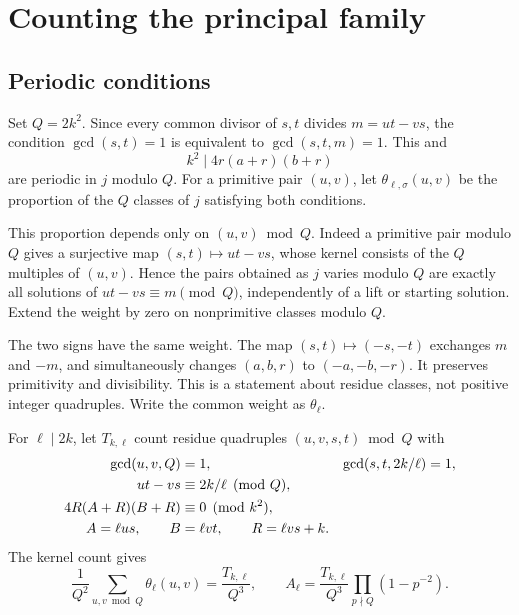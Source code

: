 \documentclass[11pt,a4paper]{article}
\numberwithin{equation}{section}
\theoremstyle{remark}
\begin{document}
\section{Counting the principal family}\label{sec:count}
\subsection{Periodic conditions}
Set $Q=2k^2$. Since every common divisor of $s,t$ divides $m=ut-vs$, the condition $\gcd(s,t)=1$ is equivalent to $\gcd(s,t,m)=1$. This and
\[
k^2\mid4r(a+r)(b+r)
\]
are periodic in $j$ modulo $Q$. For a primitive pair $(u,v)$, let $\theta_{\ell,\sigma}(u,v)$ be the proportion of the $Q$ classes of $j$ satisfying both conditions.

This proportion depends only on $(u,v)\bmod Q$. Indeed a primitive pair modulo $Q$ gives a surjective map $(s,t)\mapsto ut-vs$, whose kernel consists of the $Q$ multiples of $(u,v)$. Hence the pairs obtained as $j$ varies modulo $Q$ are exactly all solutions of $ut-vs\equiv m\pmod Q$, independently of a lift or starting solution. Extend the weight by zero on nonprimitive classes modulo $Q$.

The two signs have the same weight. The map $(s,t)\mapsto(-s,-t)$ exchanges $m$ and $-m$, and simultaneously changes $(a,b,r)$ to $(-a,-b,-r)$. It preserves primitivity and divisibility. This is a statement about residue classes, not positive integer quadruples. Write the common weight as $\theta_\ell$.

For $\ell\mid2k$, let $T_{k,\ell}$ count residue quadruples $(u,v,s,t)\bmod Q$ with
\begin{align}
\gcd(u,v,Q)&=1,&\gcd(s,t,2k/\ell)&=1,\notag\\
ut-vs&\equiv2k/\ell\pmod Q,\label{eq:T}\\
4R(A+R)(B+R)&\equiv0\pmod{k^2},\notag\\
A=\ell us,\qquad B&=\ell vt,\qquad R=\ell vs+k.\notag
\end{align}
The kernel count gives
\[
\frac1{Q^2}\sum_{u,v\bmod Q}\theta_\ell(u,v)=\frac{T_{k,\ell}}{Q^3},\qquad
A_\ell=\frac{T_{k,\ell}}{Q^3}\prod_{p\nmid Q}(1-p^{-2}).
\]
\end{document}
